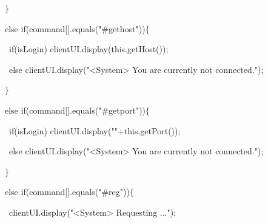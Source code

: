 {{\hlstd }{\hlstd\ \ \ }{\hlstd }{\hlsym $\}$}\leavevmode\par
{\hlstd }{\hlstd\ \ \ }{\hlstd }{\hlkwa else if}{\hlstd }{\hlsym (}{\hlstd command}{\hlsym [}{\hlstd }{}{\hlstd }{\hlsym ].}{\hlstd }{\hlkwd equals}{\hlstd }{\hlsym (}{\hlstd }{\hlstr "\#gethost"}{\hlstd }{\hlsym ))$\{$}\leavevmode\par
{\hlstd }{\hlstd\ \ \ \ }{\hlstd }{\hlkwa if}{\hlstd }{\hlsym (}{\hlstd isLogin}{\hlsym ) }{\hlstd clientUI}{\hlsym .}{\hlstd }{\hlkwd display}{\hlstd }{\hlsym (}{\hlstd }{\hlkwa this}{\hlstd }{\hlsym .}{\hlstd }{\hlkwd getHost}{\hlstd }{\hlsym ());}\leavevmode\par
{\hlstd }{\hlstd\ \ \ \ }{\hlstd }{\hlkwa else }{\hlstd clientUI}{\hlsym .}{\hlstd }{\hlkwd display}{\hlstd }{\hlsym (}{\hlstd }{\hlstr "$\mathord{<}$System$\mathord{>}$ You are currently not connected."}{\hlstd }{\hlsym );}\leavevmode\par
{\hlstd }{\hlstd\ \ \ }{\hlstd }{\hlsym $\}$}\leavevmode\par
{\hlstd }{\hlstd\ \ \ }{\hlstd }{\hlkwa else if}{\hlstd }{\hlsym (}{\hlstd command}{\hlsym [}{\hlstd }{}{\hlstd }{\hlsym ].}{\hlstd }{\hlkwd equals}{\hlstd }{\hlsym (}{\hlstd }{\hlstr "\#getport"}{\hlstd }{\hlsym ))$\{$}\leavevmode\par
{\hlstd }{\hlstd\ \ \ \ }{\hlstd }{\hlkwa if}{\hlstd }{\hlsym (}{\hlstd isLogin}{\hlsym ) }{\hlstd clientUI}{\hlsym .}{\hlstd }{\hlkwd display}{\hlstd }{\hlsym (}{\hlstd }{\hlstr ""}{\hlstd }{\hlsym $\mathord{+}$}{\hlstd }{\hlkwa this}{\hlstd }{\hlsym .}{\hlstd }{\hlkwd getPort}{\hlstd }{\hlsym ());}\leavevmode\par
{\hlstd }{\hlstd\ \ \ \ }{\hlstd }{\hlkwa else }{\hlstd clientUI}{\hlsym .}{\hlstd }{\hlkwd display}{\hlstd }{\hlsym (}{\hlstd }{\hlstr "$\mathord{<}$System$\mathord{>}$ You are currently not connected."}{\hlstd }{\hlsym );}\leavevmode\par
{\hlstd }{\hlstd\ \ \ }{\hlstd }{\hlsym $\}$}\leavevmode\par
{\hlstd }{\hlstd\ \ \ }{\hlstd }{\hlkwa else if}{\hlstd }{\hlsym (}{\hlstd command}{\hlsym [}{\hlstd }{}{\hlstd }{\hlsym ].}{\hlstd }{\hlkwd equals}{\hlstd }{\hlsym (}{\hlstd }{\hlstr "\#reg"}{\hlstd }{\hlsym ))$\{$}\leavevmode\par
{\hlstd }{\hlstd\ \ \ \ }{\hlstd clientUI}{\hlsym .}{\hlstd }{\hlkwd display}{\hlstd }{\hlsym (}{\hlstd }{\hlstr "$\mathord{<}$System$\mathord{>}$ Requesting ..."}{\hlstd }{\hlsym );}\leavevmode\par
}
